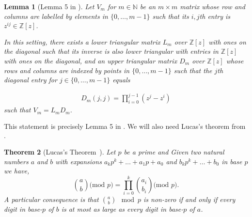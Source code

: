 \documentclass[11pt]{article}
\numberwithin{equation}{section}
\newtheorem{thm}{Theorem}[section]
\newtheorem{lem}[thm]{Lemma}
\def\Z{{\mathbb{Z}}}
\def\N{{\mathbb{N}}}
\begin{document}
\begin{lem}[Lemma 5 in \cite{arsovski2021padic}]\label{lem:diag}
Let $V_m$ for $m\in \N$ be an $m\times m$ matrix whose row and columns are labelled by elements in $\{0,\hdots,m-1\}$ such that its $i,j$th entry is $z^{ij}\in \Z[z]$. 

In this setting, there exists a lower triangular matrix $L_{m}$ over $\Z[z]$ with ones on the diagonal such that its inverse is also lower triangular with entries in $\Z[z]$ with ones on the diagonal, and an upper triangular matrix $D_{m}$ over $\Z[z]$ whose rows and columns are indexed by points in $\{0,\hdots,m-1\}$ such that the $j$th diagonal entry for $j\in \{0,\hdots,m-1\}$ equals

 \begin{align*}
 D_{m}(j,j)=      \prod_{i=0}^{j-1} (z^j-z^i)
 \end{align*}
 such that $V_{m}=L_{m}D_{m}$.
\end{lem}
This statement is precisely Lemma 5 in \cite{arsovski2021padic}. We will also need Lucas's theorem from \cite{Lucas}.





\begin{thm}[Lucas's Theorem~\cite{Lucas}]\label{thm:luc}
Let $p$ be a prime and Given two natural numbers $a$ and $b$ with expansions $a_k p^k+\hdots+a_1p+a_0$ and  
$b_kp^k+\hdots+b_0$ in base $p$ we have,
\em{$$\binom{a}{b} \text{(mod }p\text{)}=\prod\limits_{i=0}^k\binom{a_i}{b_i} \text{(mod }p\text{)} .$$}
A particular consequence is that $\binom{a}{b} \mod p$ is non-zero if and only if every digit in base-$p$ of $b$ is at most as large as every digit in base-$p$ of $a$.
\end{thm}
\end{document}
